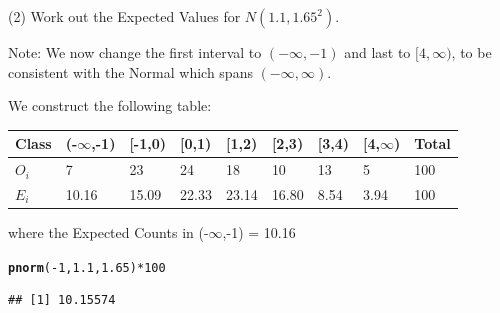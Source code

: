\documentclass[t,xcolor=pdftex,dvipsnames,table]{beamer}
\makeatletter
\newcommand{\hlnum}[1]{\textcolor[rgb]{0.686,0.059,0.569}{#1}}%
\newcommand{\hlopt}[1]{\textcolor[rgb]{0,0,0}{#1}}%
\newcommand{\hlstd}[1]{\textcolor[rgb]{0.345,0.345,0.345}{#1}}%
\newcommand{\hlkwd}[1]{\textcolor[rgb]{0.737,0.353,0.396}{\textbf{#1}}}%
\newenvironment{kframe}{%
 \def\at@end@of@kframe{}%
 \ifinner\ifhmode%
  \def\at@end@of@kframe{\end{minipage}}%
  \begin{minipage}{\columnwidth}%
 \fi\fi%
 \def\FrameCommand##1{\hskip\@totalleftmargin \hskip-\fboxsep
 \colorbox{shadecolor}{##1}\hskip-\fboxsep
     \hskip-\linewidth \hskip-\@totalleftmargin \hskip\columnwidth}%
 \MakeFramed {\advance\hsize-\width
   \@totalleftmargin\z@ \linewidth\hsize
   \@setminipage}}%
 {\par\unskip\endMakeFramed%
 \at@end@of@kframe}
\newenvironment{knitrout}{}{} %
\makeatother
\begin{document}
\begin{frame}[fragile]{}

(2) Work out the Expected Values for $N(1.1,1.65^2)$.

\vspace{.5cm}
Note: We now change the first interval to $(-\infty,-1)$ and last to $[4,\infty)$, to be consistent with the Normal which spans $(-\infty,\infty)$.

\vspace{.5cm}
We construct the following table:

\vspace{.5cm}
\begin{tabular}{l|lllllll|l} 
Class & (-$\infty$,-1) & [-1,0) & [0,1) & [1,2) & [2,3) & [3,4) & [4,$\infty$) & Total  \\ \hline
$O_{i}$ & 7 & 23 & 24 & 18 & 10 & 13 & 5 & 100    \\ \hline
$E_{i}$ & 10.16 & 15.09 & 22.33 & 23.14 & 16.80 & 8.54 & 3.94 & 100    \\ \hline
\end{tabular}

\vspace{.5cm}
where the Expected Counts in (-$\infty$,-1) = 10.16
\begin{knitrout}
\color{fgcolor}\begin{kframe}
\begin{alltt}
\hlkwd{pnorm}\hlstd{(}\hlopt{-}\hlnum{1}\hlstd{,}\hlnum{1.1}\hlstd{,}\hlnum{1.65}\hlstd{)}\hlopt{*}\hlnum{100}
\end{alltt}
\begin{verbatim}
## [1] 10.15574
\end{verbatim}
\end{kframe}
\end{knitrout}
\end{frame}
\end{document}
